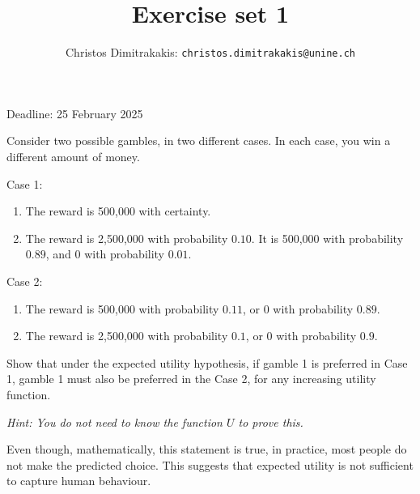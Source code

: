 \documentclass[twoside,a4paper]{article}
\begin{document}
\title{Exercise set 1}
\author{Christos Dimitrakakis: \texttt{christos.dimitrakakis@unine.ch}}

\maketitle
\large{Deadline: 25 February 2025}

\vspace{1em}

\begin{exercise}
  Consider two possible gambles, in two different cases. In each case, you win a different amount of money.
  
  Case 1:
  \begin{enumerate}
  \item The reward is 500,000 with certainty.
  \item The reward is 2,500,000 with probability $0.10$. It is 500,000 with probability $0.89$, and 0 with probability $0.01$.
  \end{enumerate}

  Case 2:
  \begin{enumerate}
  \item The reward is 500,000 with probability $0.11$, or 0 with probability $0.89$.
  \item The reward is 2,500,000 with probability $0.1$, or 0 with probability $0.9$.
  \end{enumerate}

  Show that under the expected utility hypothesis, if gamble 1 is preferred in Case 1, gamble 1 must also be preferred in the Case 2, for any increasing utility function.

  \emph{Hint: You do not need to know the function $U$ to prove this.}

  Even though, mathematically, this statement is true, in practice, most people do not make the predicted choice. This suggests that expected utility is not sufficient to capture human behaviour.
\end{exercise}
\end{document}
